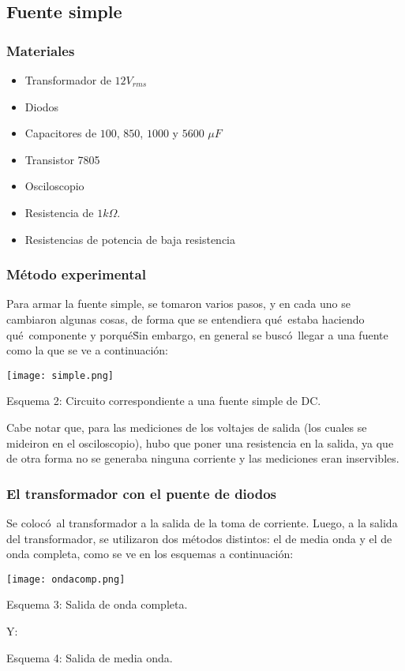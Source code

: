 \documentclass[11pt]{article}
\renewcommand{\=}[1]{\stackrel{#1}{=}} %
\theoremstyle{definition}
\theoremstyle{remark}
\begin{document}
\subsection{Fuente simple}
\subsubsection{Materiales}
\begin{itemize}
\item Transformador de $12V_{rms}$
\item Diodos
\item Capacitores de $100$, $850$, $1000$ y $5600$ $\mu F$
\item Transistor 7805
\item Osciloscopio
\item Resistencia de $1k\Omega$.
\item Resistencias de potencia de baja resistencia
\end{itemize}
\subsubsection{M\'etodo experimental}
Para armar la fuente simple, se tomaron varios pasos, y en cada uno se cambiaron algunas cosas, de forma que se entendiera qu\'e\ estaba haciendo qu\'e\ componente y porqu\'e\. Sin embargo, en general se busc\'o\ llegar a una fuente como la que se ve a continuaci\'on:
\begin{center}
\texttt{[image: simple.png]}
\end{center}
\begin{center}
Esquema 2: Circuito correspondiente a una fuente simple de DC. 
\end{center}
Cabe notar que, para las mediciones de los voltajes de salida (los cuales se mideiron en el osciloscopio), hubo que poner una resistencia en la salida, ya que de otra forma no se generaba ninguna corriente y las mediciones eran inservibles.
\subsubsection*{El transformador con el puente de diodos}
Se coloc\'o\ al transformador a la salida de la toma de corriente. Luego, a la salida del transformador, se utilizaron dos m\'etodos distintos: el de media onda y el de onda completa, como se ve en los esquemas a continuaci\'on:
\begin{center}
\texttt{[image: ondacomp.png]}
\end{center}
\begin{center}
Esquema 3: Salida de onda completa.
\end{center}
Y:
\vspace{5cm}
\begin{center}
Esquema 4: Salida de media onda.
\end{center}
\end{document}
